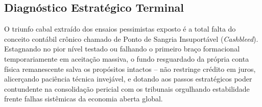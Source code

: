 \documentclass[../main.tex]{subfiles}
\begin{document}
\subsection{Diagnóstico Estratégico Terminal}

O triunfo cabal extraído dos ensaios pessimistas exposto é a total falta do conceito contábil crônico chamado de Ponto de Sangria Insuportável (\textit{Cashbleed}). Estagnando no pior nível testado ou falhando o primeiro braço formacional temporariamente em aceitação massiva, o fundo resguardado da própria conta física remanescente salva os propósitos intactos – não restringe crédito em juros, alicerçando paciência técnica invejável, e dotando aos passos estratégicos poder contundente na consolidação pericial com os tribunais orgulhando estabilidade frente falhas sistêmicas da economia aberta global.
\end{document}
